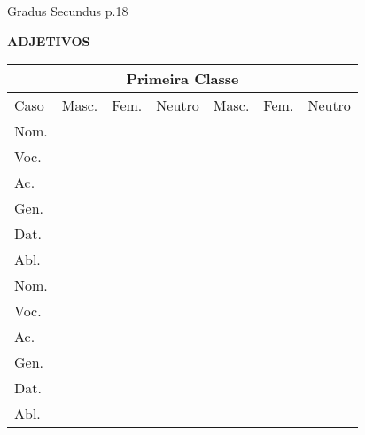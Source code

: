 \documentclass[12pt, oneside, a4paper, article]{article}
\begin{document}
\clearpage
Gradus Secundus p.18

\begin{table}[!ht]
\centering
\textbf{ADJETIVOS} 
\vspace{1 ex}

\begin{tabular}
{|l||p{1.4cm}|p{1.4cm}|p{1.4cm}||p{1.4cm}|p{1.4cm}|p{1.4cm}|}
\hline \hline
\multicolumn{7}{|c|}{Primeira Classe} \\
\hline
Caso & Masc. & Fem. & Neutro & Masc. & Fem. & Neutro \\
\hline
Nom. & & & & & & \\ \hline
Voc. & & & & & & \\ \hline
Ac.  & & & & & & \\ \hline
Gen. & & & & & & \\ \hline
Dat. & & & & & & \\ \hline
Abl. & & & & & & \\ 
\hline \hline             
Nom. & & & & & & \\ \hline
Voc. & & & & & & \\ \hline
Ac.  & & & & & & \\ \hline
Gen. & & & & & & \\ \hline
Dat. & & & & & & \\ \hline
Abl. & & & & & & \\ 
\hline \hline
\end{tabular}
\end{table}

\end{document}
